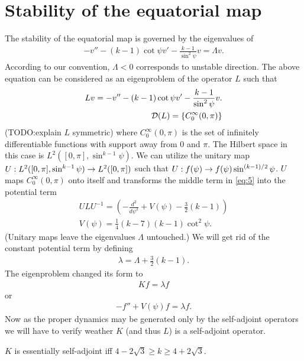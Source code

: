 \section*{Stability of the equatorial map}

The stability of the equatorial map is governed by the eigenvalues of
\begin{align}
  \label{eq:4}
  -v''-(k-1)\cot\psi v'-\frac{k-1}{\sin^2\psi}v=\Lambda v.
\end{align}
According to our convention, $\Lambda<0$ corresponds to unstable
direction. The above equation can be considered as an eigenproblem of
the operator $L$ such that
\begin{align}
  \label{eq:5}
  Lv=-v''-(k-1)\cot\psi v'-\frac{k-1}{\sin^2\psi}v.\\
  \mathcal{D}(L)=\{C^\infty_0(0,\pi)\}
\end{align}
(TODO:explain $L$ symmetric) where $C^\infty_0(0,\pi)$ is the set of
infinitely differentiable functions with support away from $0$ and
$\pi$. The Hilbert space in this case is
$L^2([0,\pi],\sin^{k-1}\psi)$. We can utilize the unitary map
$U:L^2([0,\pi],\sin^{k-1}\psi)\rightarrow L^2([0,\pi])$ such that
$U:f(\psi)\rightarrow f(\psi)\sin^{(k-1)/2}\psi$. $U$ maps $C_0^\infty(0,\pi)$
onto itself and transforms the middle term in \eqref{eq:5} into the
potential term
\begin{align}
  \label{eq:7}
  ULU^{-1}=\left(
    -\frac{d^2}{d\psi^2}+V(\psi)-\frac{3}{2}(k-1)\right)\\
  V(\psi)=\frac{1}{4}(k-7)(k-1)\cot^2\psi.
\end{align}
(Unitary maps leave the eigenvalues $\Lambda$ untouched.) We will get
rid of the constant potential term by defining
\begin{align}
  \label{eq:8}
  \lambda=\Lambda+\frac{3}{2}(k-1).
\end{align}
The eigenproblem changed its form to
\begin{align}
  \label{eq:9}
  Kf=\lambda f
\end{align}
or
\begin{align}
  \label{eq:15}
  -f''+V(\psi)f=\lambda f.
\end{align}
Now as the proper dynamics may be generated only by the self-adjoint
operators we will have to verify weather $K$ (and thus $L$) is a
self-adjoint operator.
\begin{theorem}
  $K$ is essentially self-adjoint iff $4-2\sqrt{3}\ge
  k\ge4+2\sqrt{3}$.
\end{theorem}
